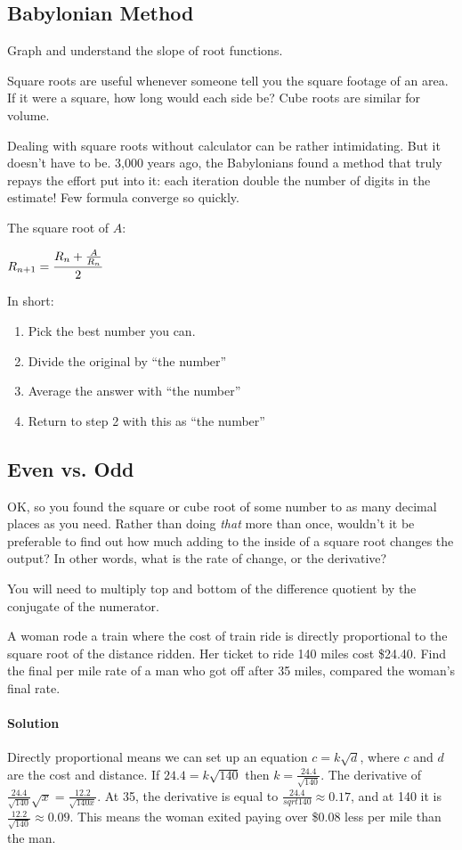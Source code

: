 
\subsection{Babylonian Method}
\begin{objective}
Graph and understand the slope of root functions.
\end{objective}
Square roots are useful whenever someone tell you the square footage of an area.  If it 
were a square, how long would each side be?  Cube roots are similar for volume. 

Dealing with square roots without calculator can be rather intimidating.  But it doesn't have
to be.  3,000 years ago, the Babylonians found a method that truly repays the effort put into it:
each iteration double the number of digits in the estimate!  Few formula converge so quickly.

The square root of $A$:

$R_{n+1}=\cfrac{R_n + \frac{A}{R_n}}{2}$

In short:
\begin{enumerate}
\item Pick the best number you can.
\item Divide the original by ``the number''
\item Average the answer with ``the number''
\item Return to step 2 with this as ``the number''
\end{enumerate}


\subsection{Even vs. Odd}
OK, so you found the square or cube root of some number to as many decimal places as
you need.  Rather than doing \emph{that} more than once, wouldn't it be preferable to find
out how much adding to the inside of a square root changes the output?  In other words,
what is the rate of change, or the derivative?

You will need to multiply top and bottom of the difference quotient by the conjugate of the
numerator.


\begin{example}
A woman rode a train where the cost of train ride is directly proportional to the square 
root of the distance ridden.  Her ticket to ride 140 miles cost \$24.40.  
Find the final per mile rate of a man who got off after 35 miles, 
compared the woman's final rate.

\paragraph{Solution}
Directly proportional means we can set up an equation $c = k \sqrt{d}$, where $c$ and $d$
are the cost and distance.  If $24.4 = k\sqrt{140}$ then $k=\frac{24.4}{\sqrt{140}}$.  The
derivative of $\frac{24.4}{\sqrt{140}}\sqrt{x} = \frac{12.2}{\sqrt{140x}}$.  At 35, the
derivative is equal to $\frac{24.4}{sqrt{140}} \approx 0.17$, and at 140 it is 
$\frac{12.2}{\sqrt{140}} \approx 0.09$.  This means the woman exited paying over
\$0.08 less per mile than the man.
\end{example}

~\vfill
